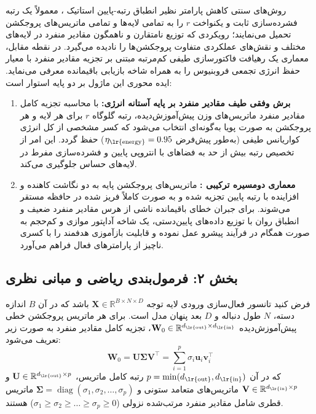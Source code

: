 روش‌های سنتی کاهش پارامتر نظیر انطباق رتبه-پایین استاتیک ، معمولاً یک رتبه فشرده‌سازی ثابت و یکنواخت $r$ را به تمامی لایه‌ها و تمامی ماتریس‌های پروجکشن تحمیل می‌نمایند؛ رویکردی که توزیع نامتقارن و ناهمگون مقادیر منفرد  در لایه‌های مختلف و نقش‌های عملکردی متفاوت پروجکشن‌ها را نادیده می‌گیرد. در نقطه مقابل، معماری  یک رهیافت فاکتورسازی طیفی کم‌مرتبه مبتنی بر تجزیه مقادیر منفرد  با معیار حفظ انرژی تجمعی فروبنیوس  را به همراه شاخه بازیابی باقیمانده  معرفی می‌نماید. ایده محوری این ماژول بر دو پایه استوار است:
\begin{enumerate}
    \item \textbf{برش وفقی طیف مقادیر منفرد بر پایه آستانه انرژی:} با محاسبه تجزیه کامل مقادیر منفرد ماتریس‌های وزن پیش‌آموزش‌دیده، رتبه گلوگاه $r$ برای هر لایه و هر پروجکشن به صورت پویا به‌گونه‌ای انتخاب می‌شود که کسر مشخصی از کل انرژی کواریانس طیفی (به‌طور پیش‌فرض $\eta_{\text{\lr{energy}}} = 0.95$) حفظ گردد. این امر از تخصیص رتبه بیش از حد به فضاهای با انتروپی پایین و فشرده‌سازی مفرط در لایه‌های حساس جلوگیری می‌کند.
    \item \textbf{معماری دومسیره ترکیبی :} ماتریس‌های پروجکشن پایه به دو نگاشت کاهنده  و افزاینده  با رتبه پایین تجزیه شده و به صورت کاملاً فریز شده  در حافظه مستقر می‌شوند. برای جبران خطای باقیمانده ناشی از هرس مقادیر منفرد ضعیف و انطباق روان با توزیع داده‌های پایین‌دستی، یک شاخه آداپتور موازی و کم‌حجم  به صورت همگام در فرآیند پیشرو عمل نموده و قابلیت بازآموزی هدفمند را با کسری ناچیز از پارامترهای فعال فراهم می‌آورد.
\end{enumerate}

\subsection*{بخش ۲: فرمول‌بندی ریاضی و مبانی نظری }
فرض کنید تانسور فعال‌سازی ورودی لایه توجه $\mathbf{X} \in \mathbb{R}^{B \times N \times D}$ باشد که در آن $B$ اندازه دسته، $N$ طول دنباله و $D$ بعد پنهان مدل است. برای هر ماتریس پروجکشن خطی پیش‌آموزش‌دیده $\mathbf{W}_0 \in \mathbb{R}^{d_{\text{\lr{out}}} \times d_{\text{\lr{in}}}}$، تجزیه کامل مقادیر منفرد  به صورت زیر تعریف می‌شود:
\begin{equation}
\mathbf{W}_0 = \mathbf{U} \mathbf{\Sigma} \mathbf{V}^\top = \sum_{i=1}^{p} \sigma_i \mathbf{u}_i \mathbf{v}_i^\top
\end{equation}
که در آن $p = \min(d_{\text{\lr{out}}}, d_{\text{\lr{in}}})$ رتبه کامل ماتریس، $\mathbf{U} \in \mathbb{R}^{d_{\text{\lr{out}}} \times p}$ و $\mathbf{V} \in \mathbb{R}^{d_{\text{\lr{in}}} \times p}$ ماتریس‌های متعامد ستونی و $\mathbf{\Sigma} = \operatorname{diag}(\sigma_1, \sigma_2, \dots, \sigma_p)$ ماتریس قطری شامل مقادیر منفرد مرتب‌شده نزولی ($\sigma_1 \ge \sigma_2 \ge \dots \ge \sigma_p \ge 0$) هستند.


